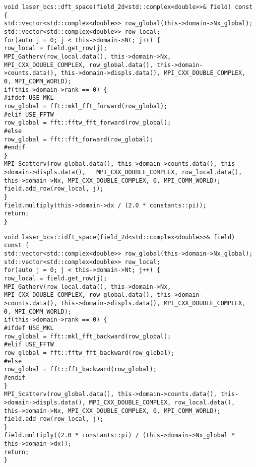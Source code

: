 \begin{lstlisting}[style=CXX, caption=Method for performing discrete Fourier transform in space]
void laser_bcs::dft_space(field_2d<std::complex<double>>& field) const {
std::vector<std::complex<double>> row_global(this->domain->Nx_global);
std::vector<std::complex<double>> row_local;
for(auto j = 0; j < this->domain->Nt; j++) {
row_local = field.get_row(j);
MPI_Gatherv(row_local.data(), this->domain->Nx, MPI_CXX_DOUBLE_COMPLEX, row_global.data(), this->domain->counts.data(), this->domain->displs.data(), MPI_CXX_DOUBLE_COMPLEX, 0, MPI_COMM_WORLD);
if(this->domain->rank == 0) {
#ifdef USE_MKL
row_global = fft::mkl_fft_forward(row_global);
#elif USE_FFTW
row_global = fft::fftw_fft_forward(row_global);
#else
row_global = fft::fft_forward(row_global);
#endif
}
MPI_Scatterv(row_global.data(), this->domain->counts.data(), this->domain->displs.data(), 	MPI_CXX_DOUBLE_COMPLEX, row_local.data(), this->domain->Nx, MPI_CXX_DOUBLE_COMPLEX, 0, MPI_COMM_WORLD);
field.add_row(row_local, j);
}
field.multiply(this->domain->dx / (2.0 * constants::pi));
return;
}
\end{lstlisting}

\begin{lstlisting}[style=CXX, caption=Method for performing inverse discrete Fourier transform in space]
void laser_bcs::idft_space(field_2d<std::complex<double>>& field) const {
std::vector<std::complex<double>> row_global(this->domain->Nx_global);
std::vector<std::complex<double>> row_local;
for(auto j = 0; j < this->domain->Nt; j++) {
row_local = field.get_row(j);
MPI_Gatherv(row_local.data(), this->domain->Nx, MPI_CXX_DOUBLE_COMPLEX, row_global.data(), this->domain->counts.data(), this->domain->displs.data(), MPI_CXX_DOUBLE_COMPLEX, 0, MPI_COMM_WORLD);
if(this->domain->rank == 0) {
#ifdef USE_MKL
row_global = fft::mkl_fft_backward(row_global);
#elif USE_FFTW
row_global = fft::fftw_fft_backward(row_global);
#else
row_global = fft::fft_backward(row_global);
#endif
}
MPI_Scatterv(row_global.data(), this->domain->counts.data(), this->domain->displs.data(), MPI_CXX_DOUBLE_COMPLEX, row_local.data(), this->domain->Nx, MPI_CXX_DOUBLE_COMPLEX, 0, MPI_COMM_WORLD);
field.add_row(row_local, j);
}
field.multiply((2.0 * constants::pi) / (this->domain->Nx_global * this->domain->dx));
return;
}
\end{lstlisting}

